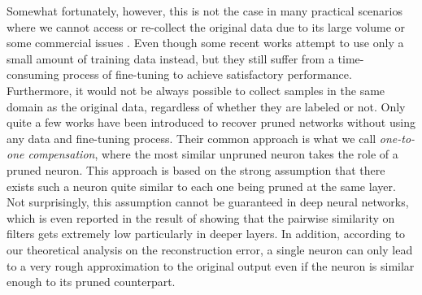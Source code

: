 Somewhat fortunately, however, this is not the case in many practical scenarios where we cannot access or re-collect the original data due to its large volume or some commercial issues \cite{DBLP:conf/eccv/MahajanGRHPLBM18}. Even though some recent works \cite{CURL,Reborn} attempt to use only a small amount of training data instead, but they still suffer from a time-consuming process of fine-tuning to achieve satisfactory performance. Furthermore, it would not be always possible to collect samples in the same domain as the original data, regardless of whether they are labeled or not. Only quite a few works \cite{NM,Data-free} have been introduced to recover pruned networks without using any data and fine-tuning process. Their common approach is what we call \textit{one-to-one compensation}, where the most similar unpruned neuron takes the role of a pruned neuron. This approach is based on the strong assumption that there exists such a neuron quite similar to each one being pruned at the same layer. Not surprisingly, this assumption cannot be guaranteed in deep neural networks, which is even reported in the result of \cite{NM} showing that the pairwise similarity on filters gets extremely low particularly in deeper layers. In addition, according to our theoretical analysis on the reconstruction error, a single neuron can only lead to a very rough approximation to the original output even if the neuron is similar enough to its pruned counterpart.





